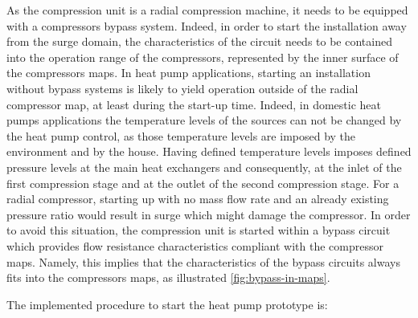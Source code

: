 As the compression unit is a radial compression machine, it needs to
be equipped with a compressors bypass system. Indeed, in order to
start the installation away from the surge domain, the characteristics
of the circuit needs to be contained into the operation range of the
compressors, represented by the inner surface of the
compressors maps. In heat pump applications, starting an installation
without bypass systems is likely to yield operation outside of the
radial compressor map, at least during the start-up time. Indeed, in
domestic heat pumps applications the temperature levels of the sources
can not be changed by the heat pump control, as those temperature
levels are imposed by the environment and by the house. Having defined
temperature levels imposes defined pressure levels at the main heat
exchangers and consequently, at the inlet of the first compression
stage and at the outlet of the second compression stage. For a radial
compressor, starting up with no mass flow rate and an already existing
pressure ratio would result in surge which might damage the
compressor. In order to avoid this situation, the compression unit is
started within a bypass circuit which provides flow resistance
characteristics compliant with the compressor maps. Namely, this
implies that the characteristics of the bypass circuits always fits
into the compressors maps, as illustrated \cref{fig:bypass-in-maps}.

The implemented procedure to start the heat pump prototype is:

